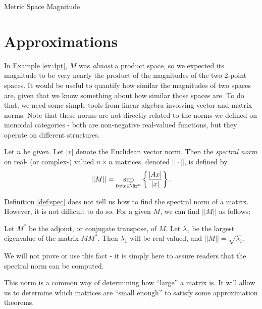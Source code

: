 \documentclass[12pt]{pom_thesis}
\begin{document}
\begin{chapter}{Metric Space Magnitude}
\section{Approximations}
In Example \ref{ex:4pt}, $M$ was \emph{almost} a product space, so we expected its magnitude to be very nearly the product of the magnitudes of the two 2-point spaces. It would be useful to quantify how similar the magnitudes of two spaces are, given that we know something about how similar those spaces are. To do that, we need some simple tools from linear algebra involving vector and matrix norms. Note that these norms are not directly related to the norms we defined on monoidal categories - both are non-negative real-valued functions, but they operate on different structures.

\begin{defn}\label{def:spec}
Let $n$ be given. Let $|v|$ denote the Euclidean vector norm. Then the \emph{spectral norm} on real- (or complex-) valued $n \times n$ matrices, denoted $||\cdot ||$, is defined by
\[
||M|| = \sup_{0 \neq x \in \Rr^n}\left\{ \frac{|Ax|}{|x|} \right\}.
\]
\end{defn}
\begin{rmk}
Definition \ref{def:spec} does not tell us how to find the spectral norm of a matrix. However, it is not difficult to do so. For a given $M$, we can find $||M||$ as follows:

Let $M^*$ be the adjoint, or conjugate transpose, of $M$. Let $\lambda_1$ be the largest eigenvalue of the matrix $MM^*$. Then $\lambda_1$ will be real-valued, and $||M||=\sqrt{\lambda_1}$. 

We will not prove or use this fact - it is simply here to assure readers that the spectral norm can be computed.
\end{rmk}
This norm is a common way of determining how ``large'' a matrix is. It will allow us to determine which matrices are ``small enough'' to satisfy some approximation theorems.


\end{chapter}
\end{document}
